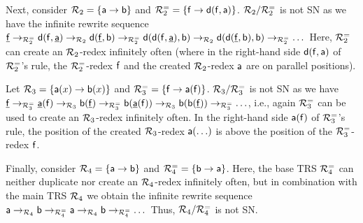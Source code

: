 \begin{example}\label{example:redex-creating}
    Next, consider $\mathcal{R}_2 = \{\mathsf{a} \to \mathsf{b}\}$ and $\mathcal{R}_2^{=} = \{\mathsf{f} \to \mathsf{d}(\mathsf{f},\mathsf{a})\}$.
    $\mathcal{R}_2 / \mathcal{R}_2^{=}$ is not SN as we have the infinite rewrite sequence $\underline{\mathsf{f}}
    \to_{\mathcal{R}_2^{=}} \mathsf{d}(\mathsf{f},\underline{\mathsf{a}}) \to_{\mathcal{R}_2} \mathsf{d}(\underline{\mathsf{f}},\mathsf{b}) \to_{\mathcal{R}_2^{=}}
    \mathsf{d}(\mathsf{d}(\mathsf{f},\underline{\mathsf{a}}),\mathsf{b}) \to_{\mathcal{R}_2}
 \mathsf{d}(\mathsf{d}(\underline{\mathsf{f}},\mathsf{b}),\mathsf{b}) \to_{\mathcal{R}_2^{=}} \ldots$\
 Here, $\mathcal{R}_2^{=}$ can create an
 $\mathcal{R}_2$-redex infinitely often (where
 in the right-hand side $\mathsf{d}(\mathsf{f},\mathsf{a})$ of $\mathcal{R}_2^{=}$'s rule, the
 $\mathcal{R}_2^=$-redex $\mathsf{f}$ and
 the created $\mathcal{R}_2$-redex $\mathsf{a}$ are on parallel positions).
\end{example}

\begin{example}\label{example:redex-creatingAbove}
  Let $\mathcal{R}_3 = \{\mathsf{a}(x) \to \mathsf{b}(x)\}$ and $\mathcal{R}_3^{=} = \{\mathsf{f} \to \mathsf{a}(\mathsf{f})\}$.
    $\mathcal{R}_3 / \mathcal{R}_3^{=}$ is not SN as we have $\underline{\mathsf{f}} \to_{\mathcal{R}_3^{=}}
    \underline{\mathsf{a}}(\mathsf{f}) \to_{\mathcal{R}_3} \mathsf{b}(\underline{\mathsf{f}}) \to_{\mathcal{R}_3^{=}}
    \mathsf{b}(\underline{\mathsf{a}}(\mathsf{f})) \to_{\mathcal{R}_3} 
 \mathsf{b}(\mathsf{b}(\underline{\mathsf{f}})) \to_{\mathcal{R}_3^{=}}\ldots$, i.e., again
    $\mathcal{R}_3^{=}$ can be used to create an
 $\mathcal{R}_3$-redex infinitely often.
 In the right-hand side $\mathsf{a}(\mathsf{f})$ of
$\mathcal{R}_3^=$'s rule,
the position  of the created $\mathcal{R}_3$-redex $\mathsf{a}(\ldots)$
    is above the position of the  $\mathcal{R}_3^=$-redex $\mathsf{f}$.
\end{example}

  

\begin{example}\label{example:ordinary-infinite}
  Finally, consider $\mathcal{R}_4 = \{\mathsf{a} \to \mathsf{b}\}$ and $\mathcal{R}_4^{=} = \{ \mathsf{b} \to \mathsf{a}\}$.
Here, the base TRS $\mathcal{R}_4^{=}$ can neither duplicate nor create an $\mathcal{R}_4$-redex infinitely often,
    but in combination with the main TRS $\mathcal{R}_4$ we obtain the
  infinite rewrite sequence $\mathsf{a} \to_{\mathcal{R}_4}
    \mathsf{b} \to_{\mathcal{R}_4^{=}} \mathsf{a} \to_{\mathcal{R}_4}
    \mathsf{b} \to_{\mathcal{R}_4^{=}} \ldots$\ Thus,
    $\mathcal{R}_4 / \mathcal{R}_4^{=}$ is not SN. 
\end{example}

